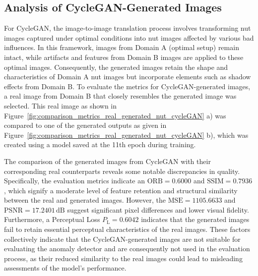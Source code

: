 \documentclass[12pt,DIV14,BCOR12mm,a4paper,footinclude=false,headinclude,parskip=half-,twoside,openright,cleardoublepage=empty,toc=index,bibliography=totoc,listof=totoc]{scrreprt}
\numberwithin{equation}{chapter}
\begin{document}
\subsection{Analysis of CycleGAN-Generated Images}
For CycleGAN, the image-to-image translation process involves transforming nut images captured under optimal conditions into nut images affected by various bad influences. In this framework, images from Domain A (optimal setup) remain intact, while artifacts and features from Domain B images are applied to these optimal images. Consequently, the generated images retain the shape and characteristics of Domain A nut images but incorporate elements such as shadow effects from Domain B. To evaluate the metrics for CycleGAN-generated images, a real image from Domain B that closely resembles the generated image was selected. This real image as shown in Figure~\ref{fig:comparison_metrics_real_generated_nut_cycleGAN} a) was compared to one of the generated outputs as given in Figure~\ref{fig:comparison_metrics_real_generated_nut_cycleGAN} b), which was created using a model saved at the 11th epoch during training.

The comparison of the generated images from CycleGAN with their corresponding real counterparts reveals some notable discrepancies in quality. Specifically, the evaluation metrics indicate an $\text{ORB} = 0.6000$ and $\text{SSIM} = 0.7936$, which signify a moderate level of feature retention and structural similarity between the real and generated images. However, the $\text{MSE} = 1105.6633$ and  $\text{PSNR} = 17.2401\,\mathrm{dB}$ suggest significant pixel differences and lower visual fidelity. Furthermore, a Perceptual Loss \( P_{\text{L}} = 0.6042 \) indicates that the generated images fail to retain essential perceptual characteristics of the real images. These factors collectively indicate that the CycleGAN-generated images are not suitable for evaluating the anomaly detector and are consequently not used in the evaluation process, as their reduced similarity to the real images could lead to misleading assessments of the model's performance.
\end{document}

